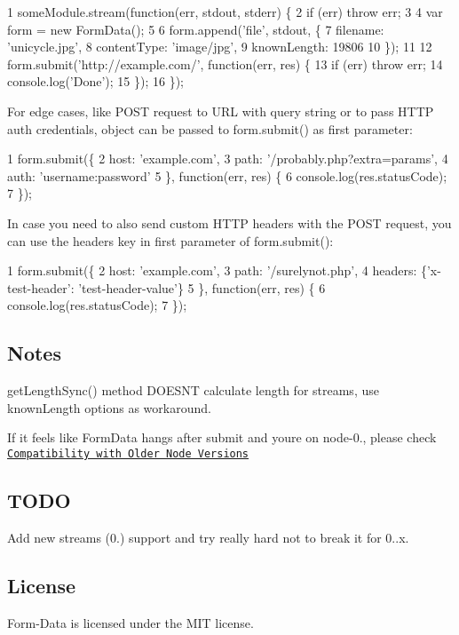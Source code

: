 \begin{DoxyCode}
1 someModule.stream(function(err, stdout, stderr) \{
2   if (err) throw err;
3 
4   var form = new FormData();
5 
6   form.append('file', stdout, \{
7     filename: 'unicycle.jpg',
8     contentType: 'image/jpg',
9     knownLength: 19806
10   \});
11 
12   form.submit('http://example.com/', function(err, res) \{
13     if (err) throw err;
14     console.log('Done');
15   \});
16 \});
\end{DoxyCode}


For edge cases, like P\+O\+S\+T request to U\+R\+L with query string or to pass H\+T\+T\+P auth credentials, object can be passed to {\ttfamily form.\+submit()} as first parameter\+:


\begin{DoxyCode}
1 form.submit(\{
2   host: 'example.com',
3   path: '/probably.php?extra=params',
4   auth: 'username:password'
5 \}, function(err, res) \{
6   console.log(res.statusCode);
7 \});
\end{DoxyCode}


In case you need to also send custom H\+T\+T\+P headers with the P\+O\+S\+T request, you can use the {\ttfamily headers} key in first parameter of {\ttfamily form.\+submit()}\+:


\begin{DoxyCode}
1 form.submit(\{
2   host: 'example.com',
3   path: '/surelynot.php',
4   headers: \{'x-test-header': 'test-header-value'\}
5 \}, function(err, res) \{
6   console.log(res.statusCode);
7 \});
\end{DoxyCode}


\subsection*{Notes}


\begin{DoxyItemize}
\item {\ttfamily get\+Length\+Sync()} method D\+O\+E\+S\+N\textquotesingle{}T calculate length for streams, use {\ttfamily known\+Length} options as workaround.
\item If it feels like Form\+Data hangs after submit and you\textquotesingle{}re on {\ttfamily node-\/0.}, please check \href{http://nodejs.org/api/stream.html#stream_compatibility_with_older_node_versions}{\tt Compatibility with Older Node Versions}
\end{DoxyItemize}

\subsection*{T\+O\+D\+O}


\begin{DoxyItemize}
\item Add new streams (0.) support and try really hard not to break it for 0..\+x.
\end{DoxyItemize}

\subsection*{License}

Form-\/\+Data is licensed under the M\+I\+T license. 